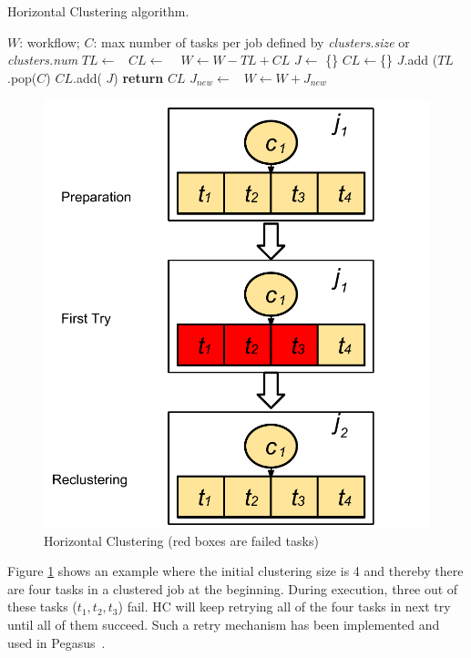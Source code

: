 \documentclass{IOS-Book-Article}
\begin{document}
\begin{algorithm}[!htb]
	\footnotesize
	\caption{Horizontal Clustering algorithm.}
	\label{alg:evaluation_hc}
	\begin{algorithmic}[1]
		\Require $W$: workflow; $C$: max number of tasks per job defined by \emph{clusters.size} or \emph{clusters.num}
				\State $TL\gets $\  
				\State $CL\gets$  \  
				\State $W \gets W - TL + CL$   
			\EndFor
		\EndProcedure
			\State $J\gets$ \{\}
			\State $CL\gets$\{\}
				\State $J$.add ($TL$.pop($C$) 
				\State  $CL$.add( $J$)
			\EndWhile
			\State \textbf{return} $CL$
		\EndProcedure
			\State $J_{new}\gets$\  
			\State $W \gets W + J_{new}$ 
		\EndProcedure
	\end{algorithmic}
\end{algorithm}


\begin{figure}[!htb]
\centering
  \includegraphics[width=0.45\linewidth]{hcr.pdf}
  \caption{Horizontal Clustering (red boxes are failed tasks)}
  \label{fig:clustering_hc}
\end{figure}

Figure \ref{fig:clustering_hc} shows an example where the initial clustering size is 4 and thereby there are four tasks in a clustered job at the beginning. During execution, three out of these tasks ($t_1, t_2, t_3$) fail. HC will keep retrying all of the four tasks in next try until all of them succeed. Such a retry mechanism has been implemented and used in Pegasus~\cite{Singh2008}.
\end{document}
